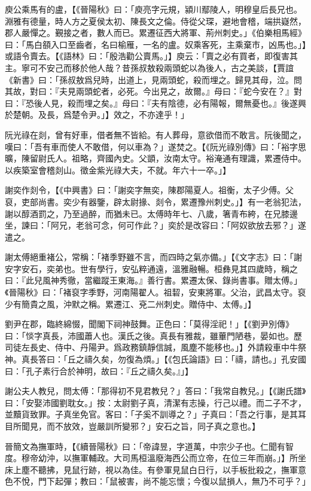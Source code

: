 庾公乘馬有的盧，【《晉陽秋》曰：「庾亮字元規，潁川鄢陵人，明穆皇后長兄也。淵雅有德量，時人方之夏侯太初、陳長文之倫。侍從父琛，避地會稽，端拱嶷然，郡人嚴憚之。覲接之者，數人而已。累遷征西大將軍、荊州刺史。」《伯樂相馬經》曰：「馬白頟入口至齒者，名曰榆雁，⼀名的盧。奴乘客死，主乘棄市，凶馬也。」】或語令賣去。【《語林》曰：「殷浩勸公賣馬。」】庾云：「賣之必有買者，即復害其主。寧可不安己而移於他人哉？昔孫叔敖殺兩頭蛇以為後人，古之美談，【賈誼《新書》曰：「孫叔敖爲兒時，出道上，見兩頭蛇，殺而埋之。歸見其母，泣。問其故，對曰：『夫見兩頭蛇者，必死。今出見之，故爾。』母曰：『蛇今安在？』對曰：『恐後人見，殺而埋之矣。』母曰：『夫有陰德，必有陽報，爾無憂也。』後遂興於楚朝。及長，爲楚令尹。」】效之，不亦達乎！」

阮光祿在剡，曾有好車，借者無不皆給。有人葬母，意欲借而不敢言。阮後聞之，嘆曰：「吾有車而使人不敢借，何以車為？」遂焚之。【《阮光祿別傳》曰：「裕字思曠，陳留尉氏人。祖略，齊國內史。父顗，汝南太守。裕淹通有理識，累遷侍中。以疾築室會稽剡山。徵金紫光祿大夫，不就。年六十⼀卒。」】

謝奕作剡令，【《中興書》曰：「謝奕字無奕，陳郡陽夏人。祖衡，太子少傅。父裒，吏部尚書。奕少有器鑒，辟太尉掾、剡令，累遷豫州刺史。」】有一老翁犯法，謝以醇酒罰之，乃至過醉，而猶未已。太傅時年七、八歲，箸青布絝，在兄膝邊坐，諫曰：「阿兄，老翁可念，何可作此？」奕於是改容曰：「阿奴欲放去邪？」遂遣之。

謝太傅絕重褚公，常稱：「褚季野雖不言，而四時之氣亦備。」【《文字志》曰：「謝安字安石，奕弟也。世有學行，安弘粹通遠，溫雅融暢。桓彝見其四歲時，稱之曰：『此兒⾵神秀徹，當繼蹤王東海。』善行書。累遷太保、錄尚書事。贈太傅。」《晉陽秋》曰：「褚裒字季野，河南陽翟人。祖䂮，安東將軍。父治，武昌太守。裒少有簡貴之風，沖默之稱。累遷江、兗⼆州刺史。贈侍中、太傅。」】

劉尹在郡，臨終綿惙，聞閣下祠神鼓舞。正色曰：「莫得淫祀！」【《劉尹別傳》曰：「惔字真⾧，沛國蕭人也。漢氏之後。真⾧有雅裁，雖蓽門陋巷，晏如也。歷司徒左長史、侍中、丹陽尹。爲政務鎮靜信誠，⾵塵不能移也。」】外請殺車中牛祭神。真長答曰：「丘之禱久矣，勿復為煩。」【《包氏論語》曰：「禱，請也。」孔安國曰：「孔子素行合於神明，故曰：『丘之禱久矣。』」】

謝公夫人教兒，問太傅：「那得初不見君教兒？」答曰：「我常自教兒。」【《謝氏譜》曰：「安娶沛國劉耽女。」按：太尉劉子真，清潔有志操，行己以禮。而二子不才，並黷貨致罪。子真坐免官。客曰：「子奚不訓導之？」子真曰：「吾之行事，是其耳目所聞見，而不放效，豈嚴訓所變邪？」安石之旨，同子真之意也。】

晉簡文為撫軍時，【《續晉陽秋》曰：「帝諱昱，字道萬，中宗少子也。仁聞有智度。穆帝幼沖，以撫軍輔政。大司馬桓溫廢海西公而立帝，在位三年而崩。」】所坐床上塵不聽拂，見鼠行跡，視以為佳。有參軍見鼠白日行，以手板批殺之，撫軍意色不悅，門下起彈；教曰：「鼠被害，尚不能忘懷；今復以鼠損人，無乃不可乎？」

